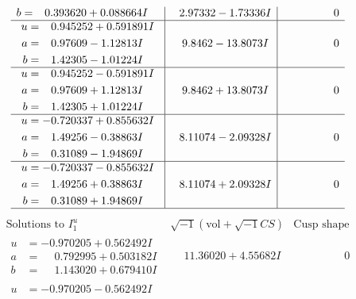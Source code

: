 \documentclass[1p]{elsarticle_modified}
\theoremstyle{definition}
\newcommand{\I}{\sqrt{-1}}
\begin{document}
$$\begin{array}{c|c|c}
\begin{aligned}
b &= \phantom{-}0.393620 + 0.088664 I\end{aligned}
 & \phantom{-}2.97332 - 1.73336 I & \phantom{-0.000000 } 0 \\ \hline\begin{aligned}
u &= \phantom{-}0.945252 + 0.591891 I \\
a &= \phantom{-}0.97609 - 1.12813 I \\
b &= \phantom{-}1.42305 - 1.01224 I\end{aligned}
 & \phantom{-}9.8462 - 13.8073 I & \phantom{-0.000000 } 0 \\ \hline\begin{aligned}
u &= \phantom{-}0.945252 - 0.591891 I \\
a &= \phantom{-}0.97609 + 1.12813 I \\
b &= \phantom{-}1.42305 + 1.01224 I\end{aligned}
 & \phantom{-}9.8462 + 13.8073 I & \phantom{-0.000000 } 0 \\ \hline\begin{aligned}
u &= -0.720337 + 0.855632 I \\
a &= \phantom{-}1.49256 - 0.38863 I \\
b &= \phantom{-}0.31089 - 1.94869 I\end{aligned}
 & \phantom{-}8.11074 - 2.09328 I & \phantom{-0.000000 } 0 \\ \hline\begin{aligned}
u &= -0.720337 - 0.855632 I \\
a &= \phantom{-}1.49256 + 0.38863 I \\
b &= \phantom{-}0.31089 + 1.94869 I\end{aligned}
 & \phantom{-}8.11074 + 2.09328 I & \phantom{-0.000000 } 0\\
 \hline 
 \end{array}$$\newpage$$\begin{array}{c|c|c}  
\text{Solutions to }I^u_{1}& \I (\text{vol} + \sqrt{-1}CS) & \text{Cusp shape}\\
 \hline 
\begin{aligned}
u &= -0.970205 + 0.562492 I \\
a &= \phantom{-}0.792995 + 0.503182 I \\
b &= \phantom{-}1.143020 + 0.679410 I\end{aligned}
 & \phantom{-}11.36020 + 4.55682 I & \phantom{-0.000000 } 0 \\ \hline\begin{aligned}
u &= -0.970205 - 0.562492 I \\

\end{aligned}
\end{array}$$
\end{document}
